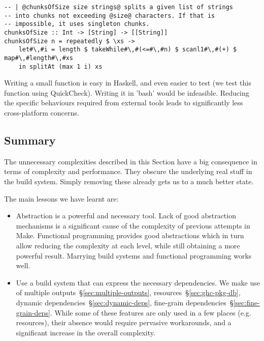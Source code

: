 \begin{lstlisting}
-- | @chunksOfSize size strings@ splits a given list of strings
-- into chunks not exceeding @size@ characters. If that is
-- impossible, it uses singleton chunks.
chunksOfSize :: Int -> [String] -> [[String]]
chunksOfSize n = repeatedly $ \xs ->
    let#\,#i = length $ takeWhile#\,#(<=#\,#n) $ scanl1#\,#(+) $ map#\,#length#\,#xs
    in splitAt (max 1 i) xs
\end{lstlisting}

\noindent Writing a small function is easy in Haskell, and even easier to test
(we test this function using QuickCheck). Writing it in \lst'bash' would be infeasible.
Reducing the specific behaviours required from external tools leads to
significantly less cross-platform concerns.

\subsection{Summary}

The unnecessary complexities described in this Section have a big consequence in
terms of complexity and performance. They obscure the underlying real stuff in
the build system. Simply removing these already gets us to a much better state.

The main lessons we have learnt are:

\begin{itemize}
\item Abstraction is a powerful and necessary tool. Lack of good abstraction
mechanisms is a significant cause of the complexity of previous attempts in
Make. Functional programming provides good abstractions which in turn allow
reducing the complexity at each level, while still obtaining a more powerful
result. Marrying build systems and functional programming works well.
\item Use a build system that can express the necessary dependencies. We make
use of multiple outputs~\S\ref{sec:multiple-outputs},
resources~\S\ref{sec:ghc-pkg-db}, dynamic dependencies~\S\ref{sec:dynamic-deps},
fine-grain dependencies~\S\ref{sec:fine-grain-deps}. While some of these
features are only used in a few places (e.g. resources), their absence would
require pervasive workarounds, and a significant increase in the overall complexity.
\end{itemize}

